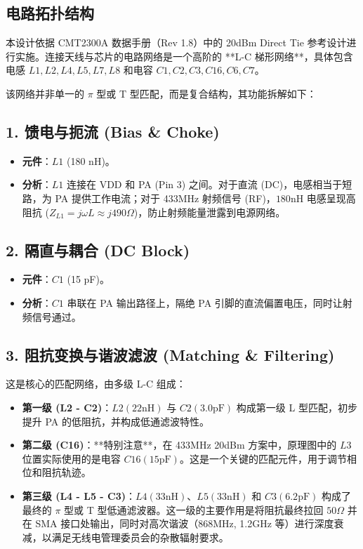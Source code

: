 \documentclass[a4paper,12pt]{article}
\begin{document}
	\subsection{电路拓扑结构}
	本设计依据 CMT2300A 数据手册（Rev 1.8）中的 20dBm Direct Tie 参考设计进行实施。连接天线与芯片的电路网络是一个高阶的 **L-C 梯形网络**，具体包含电感 $L1, L2, L4, L5, L7, L8$ 和电容 $C1, C2, C3, C16, C6, C7$。

	该网络并非单一的 $\pi$ 型或 T 型匹配，而是复合结构，其功能拆解如下：

	\subsection{1. 馈电与扼流 (Bias \& Choke)}
	\begin{itemize}
		\item \textbf{元件}：$L1$ (180 nH)。
		\item \textbf{分析}：$L1$ 连接在 VDD 和 PA (Pin 3) 之间。对于直流 (DC)，电感相当于短路，为 PA 提供工作电流；对于 433MHz 射频信号 (RF)，$180\text{nH}$ 电感呈现高阻抗 ($Z_{L1} = j\omega L \approx j490\Omega$)，防止射频能量泄露到电源网络。
	\end{itemize}

	\subsection{2. 隔直与耦合 (DC Block)}
	\begin{itemize}
		\item \textbf{元件}：$C1$ (15 pF)。
		\item \textbf{分析}：$C1$ 串联在 PA 输出路径上，隔绝 PA 引脚的直流偏置电压，同时让射频信号通过。
	\end{itemize}

	\subsection{3. 阻抗变换与谐波滤波 (Matching \& Filtering)}
	这是核心的匹配网络，由多级 L-C 组成：
	\begin{itemize}
		\item \textbf{第一级 (L2 - C2)}：$L2 (22\text{nH})$ 与 $C2 (3.0\text{pF})$ 构成第一级 L 型匹配，初步提升 PA 的低阻抗，并构成低通滤波特性。
		\item \textbf{第二级 (C16)}：**特别注意**，在 433MHz 20dBm 方案中，原理图中的 $L3$ 位置实际使用的是电容 $C16 (15\text{pF})$。这是一个关键的匹配元件，用于调节相位和阻抗轨迹。
		\item \textbf{第三级 (L4 - L5 - C3)}：$L4 (33\text{nH})$、$L5 (33\text{nH})$ 和 $C3 (6.2\text{pF})$ 构成了最终的 $\pi$ 型或 T 型低通滤波器。这一级的主要作用是将阻抗最终拉回 $50\Omega$ 并在 SMA 接口处输出，同时对高次谐波（868MHz, 1.2GHz 等）进行深度衰减，以满足无线电管理委员会的杂散辐射要求。
	\end{itemize}
\end{document}

